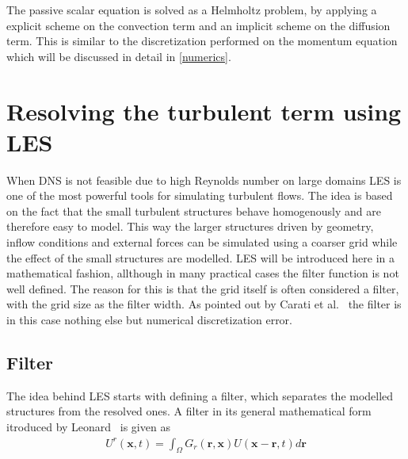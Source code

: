 The passive scalar equation is solved as a Helmholtz problem, by applying a explicit scheme on the convection term and an implicit 
scheme on the diffusion term. This is similar to the discretization performed on the momentum equation which will be discussed in 
detail in \cref{numerics}. 

\section{Resolving the turbulent term using LES} \label{LES}
When DNS is not feasible due to high Reynolds number on large domains LES is one of the most powerful tools for simulating turbulent flows.
The idea is based on the fact that the small turbulent structures behave homogenously and are therefore easy to model.
This way the larger structures driven by geometry, inflow conditions and external forces can be simulated using a coarser 
grid while the effect of the small structures are modelled. 
LES will be introduced here in a mathematical fashion, allthough in many practical cases the filter function is not 
well defined. The reason for this is that the grid itself is often considered a filter, with the 
grid size as the filter width. As pointed out by Carati et al.~\cite{Carati} the filter is in this case nothing else but 
numerical discretization error. 

\subsection{Filter}
The idea behind LES starts with defining a filter, which separates the modelled structures from the resolved ones. 
A filter in its general mathematical form itroduced by Leonard~\cite{Leonard} is given as 
\begin{align}
    U^r(\mathbf{x},t) = \int_{\Omega} G_r(\mathbf{r},\mathbf{x})U(\mathbf{x}-\mathbf{r},t)d\mathbf{r}
    \label{eq:filter}
\end{align}


 
